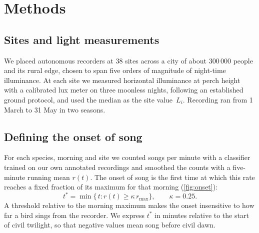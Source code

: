 \documentclass[11pt]{article}
\newcommand{\sidecite}[2][]{\sidenote{\fullcite[#1]{#2}.}}
\begin{document}
\section{Methods}

\subsection{Sites and light measurements}

We placed autonomous recorders at 38 sites across a city of about 300\,000
people and its rural edge, chosen to span five orders of magnitude of
night-time illuminance. At each site we measured horizontal illuminance at
perch height with a calibrated lux meter on three moonless nights, following an
established ground protocol,\sidecite{dacosta2019} and used the median as the
site value~$L_i$. Recording ran from 1 March to 31 May in two seasons.

\subsection{Defining the onset of song}

\begin{marginfigure}
\caption{Onset $t^{\ast}$ is the first minute at which the smoothed song rate
  reaches a fraction $\kappa$ of its morning maximum.}
\label{fig:onset}
\end{marginfigure}
For each species, morning and site we counted songs per minute with a
classifier trained on our own annotated recordings\sidecite{verbeek2021} and
smoothed the counts with a five-minute running mean $r(t)$. The onset of song
is the first time at which this rate reaches a fixed fraction of its maximum
for that morning (\cref{fig:onset}):
\begin{equation}
  t^{\ast} = \min\bigl\{\, t : r(t) \ge \kappa \, r_{\max} \bigr\},
  \qquad \kappa = 0.25 .
  \label{eq:onset}
\end{equation}
A threshold relative to the morning maximum makes the onset insensitive to
how far a bird sings from the recorder. We express $t^{\ast}$ in minutes
relative to the start of civil twilight, so that negative values mean song
before civil dawn.
\end{document}

